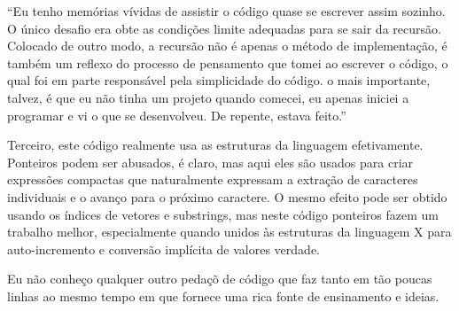 ``Eu tenho memórias vívidas de assistir o código quase se escrever
assim sozinho. O único desafio era obte as condições limite adequadas
para se sair da recursão. Colocado de outro modo, a recursão não é
apenas o método de implementação, é também um reflexo do processo de
pensamento que tomei ao escrever o código, o qual foi em parte
responsável pela simplicidade do código. o mais importante, talvez, é
que eu não tinha um projeto quando comecei, eu apenas iniciei a
programar e vi o que se desenvolveu. De repente, estava feito.''

Terceiro, este código realmente usa as estruturas da linguagem
efetivamente. Ponteiros podem ser abusados, é claro, mas aqui eles são
usados para criar expressões compactas que naturalmente expressam a
extração de caracteres individuais e o avanço para o próximo
caractere. O mesmo efeito pode ser obtido usando os índices de vetores
e substrings, mas neste código ponteiros fazem um trabalho melhor,
especialmente quando unidos às estruturas da linguagem X para
auto-incremento e conversão implícita de valores verdade.

Eu não conheço qualquer outro pedaçõ de código que faz tanto em tão
poucas linhas ao mesmo tempo em que fornece uma rica fonte de
ensinamento e ideias.

\fim
